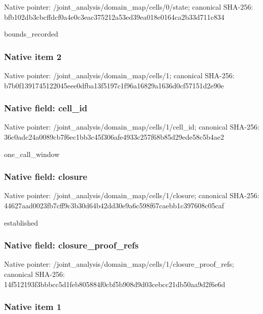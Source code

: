 \documentclass[10pt,a4paper]{article}
\begin{document}
Native pointer: /joint\_analysis/domain\_m\allowbreak{}ap/cells/0/state; canonical SHA-256: bfb102db3cbcffdcf0a4e0c3\allowbreak{}eac375212a53ed39ea018e01\allowbreak{}64ca2b33d711c834


bounds\_recorded


\subsubsection{Native item 2}


Native pointer: /joint\_analysis/domain\_map/cells/1; canonical SHA-256: b7b0f1391745122045eee0df\allowbreak{}ba13f5197c1f96a16829a163\allowbreak{}6d0cf57151d2e90e



\subsubsection{Native field: cell\_id}


Native pointer: /joint\_analysis/domain\_m\allowbreak{}ap/cells/1/cell\_id; canonical SHA-256: 36c0adc24a0089cb7f6ec1bb\allowbreak{}3c45f306afe4933c257f68b8\allowbreak{}5d29ede58c5b4ae2


one\_call\_window


\subsubsection{Native field: closure}


Native pointer: /joint\_analysis/domain\_m\allowbreak{}ap/cells/1/closure; canonical SHA-256: 44627aad0023fb7cff9c3b30\allowbreak{}d64b42dd30e9a6c598f67cae\allowbreak{}bb1c397608c05caf


established


\subsubsection{Native field: closure\_proof\_refs}


Native pointer: /joint\_analysis/domain\_m\allowbreak{}ap/cells/1/closure\_proof\allowbreak{}\_refs; canonical SHA-256: 14f512193f3bbbcc5d1feb80\allowbreak{}5884f0cbf5b908d9d03cebcc\allowbreak{}21db50aa9d2f6e6d



\subsubsection{Native item 1}
\end{document}
